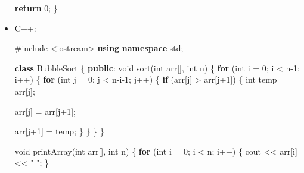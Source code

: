 \documentclass[
  letterpaper,
]{scrbook}
\newenvironment{Shaded}{\begin{snugshade}}{\end{snugshade}}
\newcommand{\ControlFlowTok}[1]{\textcolor[rgb]{0.00,0.23,0.31}{\textbf{#1}}}
\newcommand{\DataTypeTok}[1]{\textcolor[rgb]{0.68,0.00,0.00}{#1}}
\newcommand{\DecValTok}[1]{\textcolor[rgb]{0.68,0.00,0.00}{#1}}
\newcommand{\ImportTok}[1]{\textcolor[rgb]{0.00,0.46,0.62}{#1}}
\newcommand{\KeywordTok}[1]{\textcolor[rgb]{0.00,0.23,0.31}{\textbf{#1}}}
\newcommand{\NormalTok}[1]{\textcolor[rgb]{0.00,0.23,0.31}{#1}}
\newcommand{\OperatorTok}[1]{\textcolor[rgb]{0.37,0.37,0.37}{#1}}
\newcommand{\PreprocessorTok}[1]{\textcolor[rgb]{0.68,0.00,0.00}{#1}}
\newcommand{\StringTok}[1]{\textcolor[rgb]{0.13,0.47,0.30}{#1}}
\begin{document}
\begin{itemize}
\begin{Shaded}
\begin{Highlighting}[]
  \ControlFlowTok{return} \DecValTok{0}\OperatorTok{;}
\OperatorTok{\}}
\end{Highlighting}
\end{Shaded}
\item
  C++:

\begin{Shaded}
\begin{Highlighting}[]
\PreprocessorTok{\#include }\ImportTok{\textless{}iostream\textgreater{}}
\KeywordTok{using} \KeywordTok{namespace}\NormalTok{ std}\OperatorTok{;}

\KeywordTok{class}\NormalTok{ BubbleSort }\OperatorTok{\{}
\KeywordTok{public}\OperatorTok{:}
  \DataTypeTok{void}\NormalTok{ sort}\OperatorTok{(}\DataTypeTok{int}\NormalTok{ arr}\OperatorTok{[],} \DataTypeTok{int}\NormalTok{ n}\OperatorTok{)} \OperatorTok{\{}
    \ControlFlowTok{for} \OperatorTok{(}\DataTypeTok{int}\NormalTok{ i }\OperatorTok{=} \DecValTok{0}\OperatorTok{;}\NormalTok{ i }\OperatorTok{\textless{}}\NormalTok{ n}\OperatorTok{{-}}\DecValTok{1}\OperatorTok{;}\NormalTok{ i}\OperatorTok{++)} \OperatorTok{\{}
      \ControlFlowTok{for} \OperatorTok{(}\DataTypeTok{int}\NormalTok{ j }\OperatorTok{=} \DecValTok{0}\OperatorTok{;}\NormalTok{ j }\OperatorTok{\textless{}}\NormalTok{ n}\OperatorTok{{-}}\NormalTok{i}\OperatorTok{{-}}\DecValTok{1}\OperatorTok{;}\NormalTok{ j}\OperatorTok{++)} \OperatorTok{\{}
        \ControlFlowTok{if} \OperatorTok{(}\NormalTok{arr}\OperatorTok{[}\NormalTok{j}\OperatorTok{]} \OperatorTok{\textgreater{}}\NormalTok{ arr}\OperatorTok{[}\NormalTok{j}\OperatorTok{+}\DecValTok{1}\OperatorTok{])} \OperatorTok{\{}
          \DataTypeTok{int}\NormalTok{ temp }\OperatorTok{=}\NormalTok{ arr}\OperatorTok{[}\NormalTok{j}\OperatorTok{];}

\NormalTok{          arr}\OperatorTok{[}\NormalTok{j}\OperatorTok{]} \OperatorTok{=}\NormalTok{ arr}\OperatorTok{[}\NormalTok{j}\OperatorTok{+}\DecValTok{1}\OperatorTok{];}

\NormalTok{          arr}\OperatorTok{[}\NormalTok{j}\OperatorTok{+}\DecValTok{1}\OperatorTok{]} \OperatorTok{=}\NormalTok{ temp}\OperatorTok{;}
        \OperatorTok{\}}
      \OperatorTok{\}}
    \OperatorTok{\}}
  \OperatorTok{\}}

  \DataTypeTok{void}\NormalTok{ printArray}\OperatorTok{(}\DataTypeTok{int}\NormalTok{ arr}\OperatorTok{[],} \DataTypeTok{int}\NormalTok{ n}\OperatorTok{)} \OperatorTok{\{}
    \ControlFlowTok{for} \OperatorTok{(}\DataTypeTok{int}\NormalTok{ i }\OperatorTok{=} \DecValTok{0}\OperatorTok{;}\NormalTok{ i }\OperatorTok{\textless{}}\NormalTok{ n}\OperatorTok{;}\NormalTok{ i}\OperatorTok{++)} \OperatorTok{\{}
\NormalTok{      cout }\OperatorTok{\textless{}\textless{}}\NormalTok{ arr}\OperatorTok{[}\NormalTok{i}\OperatorTok{]} \OperatorTok{\textless{}\textless{}} \StringTok{" "}\OperatorTok{;}
    \OperatorTok{\}}


\end{Highlighting}
\end{Shaded}
\end{itemize}
\end{document}

